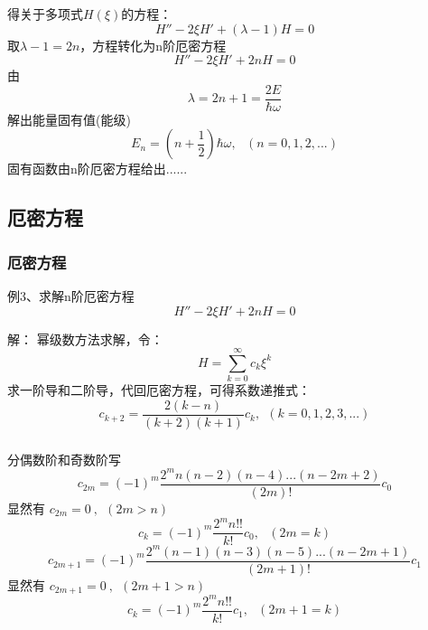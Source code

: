 \begin{frame}
	\frametitle{}
	得关于多项式$H(\xi)$的方程： \\  
	\begin{equation*}
		H'' -2 \xi H' +(\lambda -1) H=0 
	\end{equation*}  
	取$\lambda -1= 2n $，方程转化为n阶厄密方程
	\begin{equation*}
		H'' -2 \xi H' +2n H=0 
	\end{equation*}  
	由
	\begin{equation*}
		\lambda = 2n +1 = \frac{2E}{\hbar  \omega}  
	\end{equation*}  
	解出能量固有值(能级)
	\begin{equation*}
		E_n=\left(n+\frac{1}{2}\right) \hbar \omega, ~~~  ( n=0,1,2, ...)  
	\end{equation*}  
	固有函数由n阶厄密方程给出......
\end{frame}

\subsection{厄密方程}

\begin{frame}
	\frametitle{厄密方程}
	\begin{exampleblock} {例3、求解n阶厄密方程}
		\begin{equation*}
			H'' -2 \xi H' +2n H=0 
		\end{equation*}  
	\end{exampleblock}
	\alert{解：} 	幂级数方法求解，令：
	\begin{equation*}
		H=\sum_{k=0}^{\infty} c_k \xi ^k
	\end{equation*}     
	求一阶导和二阶导，代回厄密方程，可得系数递推式：
	\begin{equation*}
		c_{k+2} = \frac{ 2(k-n)}{(k+2)(k+1) } c_k, ~~  \left( k=0,1,2,3, ...  \right)
	\end{equation*}   
\end{frame}

\begin{frame}
	\frametitle{}
	分偶数阶和奇数阶写
	\begin{equation*}
		c_{2m} = (-1) ^m \frac{2^mn(n-2)(n-4) ... (n-2m+2)  } {(2m)!} c_0
	\end{equation*}   
	显然有 $ c_{2m} =0~, ~~(2m>n)$
	\begin{equation*}
		c_{k} = (-1) ^m \frac{2^mn !! } {k!} c_0, ~~~(2m=k)
	\end{equation*}   
	\begin{equation*}
		c_{2m+1} = (-1) ^m \frac{2^m (n-1) (n-3)(n-5)...(n-2m+1)  } {(2m+1)!} c_1
	\end{equation*}   
	显然有 $ c_{2m+1} =0~, ~~(2m+1>n)$
	\begin{equation*}
		c_{k} = (-1) ^m \frac{2^m n!! }{k!} c_1, ~~~ (2m+1=k)
	\end{equation*}  
\end{frame}


